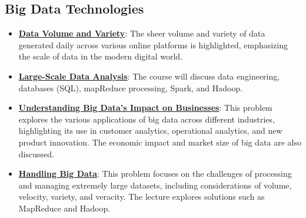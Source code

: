 \documentclass{article}%
\begin{document}
\subsection{Big Data Technologies}%
\label{subsec:BigDataTechnologies}%
\begin{itemize}[leftmargin=*]%
\item \href{https://purdue.brightspace.com/d2l/common/assets/pdfjs-d2l-dist/1.0.14-legacy/web/viewer.html?file=\%2Fcontent\%2Fenforced\%2F1095465-WL.202510.CS24200.LE1\%2F01L1-introduction.pdf\%3Fou\%3D1095465\&lang=en-us\&container=d2l-fileviewer-rendered-pdf\&fullscreen=d2l-fileviewer-rendered-pdf-dialog\&height=667#page=2}{\textbf{Data Volume and Variety}}: The sheer volume and variety of data generated daily across various online platforms is highlighted, emphasizing the scale of data in the modern digital world.%
\item \href{https://purdue.brightspace.com/d2l/common/assets/pdfjs-d2l-dist/1.0.14-legacy/web/viewer.html?file=\%2Fcontent\%2Fenforced\%2F1095465-WL.202510.CS24200.LE1\%2F01L1-introduction.pdf\%3Fou\%3D1095465\&lang=en-us\&container=d2l-fileviewer-rendered-pdf\&fullscreen=d2l-fileviewer-rendered-pdf-dialog\&height=667#page=4}{\textbf{Large-Scale Data Analysis}}: The course will discuss data engineering, databases (SQL), mapReduce processing, Spark, and Hadoop.%
\item \href{https://purdue.brightspace.com/d2l/common/assets/pdfjs-d2l-dist/1.0.14-legacy/web/viewer.html?file=\%2Fcontent\%2Fenforced\%2F1095465-WL.202510.CS24200.LE1\%2F02L1-datas-intro.pdf\%3Fou\%3D1095465\&lang=en-us\&container=d2l-fileviewer-rendered-pdf\&fullscreen=d2l-fileviewer-rendered-pdf-dialog\&height=667#page=6}{\textbf{Understanding Big Data's Impact on Businesses}}: This problem explores the various applications of big data across different industries, highlighting its use in customer analytics, operational analytics, and new product innovation. The economic impact and market size of big data are also discussed.%
\item \href{https://purdue.brightspace.com/d2l/common/assets/pdfjs-d2l-dist/1.0.14-legacy/web/viewer.html?file=\%2Fcontent\%2Fenforced\%2F1095465-WL.202510.CS24200.LE1\%2F21L2-data-engineering.pdf\%3Fou\%3D1095465\&lang=en-us\&container=d2l-fileviewer-rendered-pdf\&fullscreen=d2l-fileviewer-rendered-pdf-dialog\&height=667#page=3}{\textbf{Handling Big Data}}: This problem focuses on the challenges of processing and managing extremely large datasets, including considerations of volume, velocity, variety, and veracity. The lecture explores solutions such as MapReduce and Hadoop.%

\end{itemize}
\end{document}

